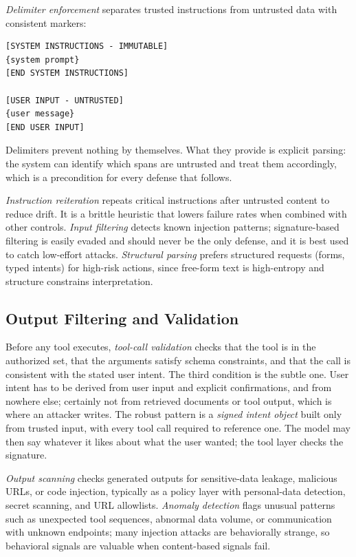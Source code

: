 \documentclass[11pt]{book}
\begin{document}
\textit{Delimiter enforcement} separates trusted instructions from untrusted data with consistent markers:
\begin{verbatim}
[SYSTEM INSTRUCTIONS - IMMUTABLE]
{system prompt}
[END SYSTEM INSTRUCTIONS]

[USER INPUT - UNTRUSTED]
{user message}
[END USER INPUT]
\end{verbatim}
Delimiters prevent nothing by themselves. What they provide is explicit parsing: the system can identify which spans are untrusted and treat them accordingly, which is a precondition for every defense that follows.

\textit{Instruction reiteration} repeats critical instructions after untrusted content to reduce drift. It is a brittle heuristic that lowers failure rates when combined with other controls. \textit{Input filtering} detects known injection patterns; signature-based filtering is easily evaded and should never be the only defense, and it is best used to catch low-effort attacks. \textit{Structural parsing} prefers structured requests (forms, typed intents) for high-risk actions, since free-form text is high-entropy and structure constrains interpretation.

\subsection{Output Filtering and Validation}

Before any tool executes, \textit{tool-call validation} checks that the tool is in the authorized set, that the arguments satisfy schema constraints, and that the call is consistent with the stated user intent. The third condition is the subtle one. User intent has to be derived from user input and explicit confirmations, and from nowhere else; certainly not from retrieved documents or tool output, which is where an attacker writes. The robust pattern is a \textit{signed intent object} built only from trusted input, with every tool call required to reference one. The model may then say whatever it likes about what the user wanted; the tool layer checks the signature.

\textit{Output scanning} checks generated outputs for sensitive-data leakage, malicious URLs, or code injection, typically as a policy layer with personal-data detection, secret scanning, and URL allowlists. \textit{Anomaly detection} flags unusual patterns such as unexpected tool sequences, abnormal data volume, or communication with unknown endpoints; many injection attacks are behaviorally strange, so behavioral signals are valuable when content-based signals fail.
\end{document}
